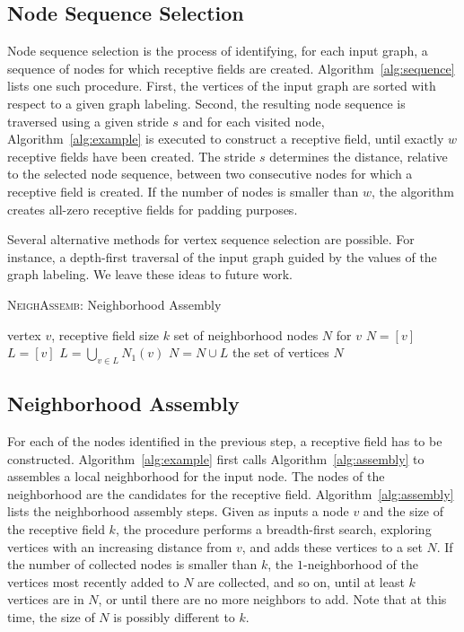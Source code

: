 \documentclass{article}
\begin{document}
\subsection{Node Sequence Selection}
Node sequence selection is the process of identifying, for each input graph, a sequence of nodes for which receptive fields are created. Algorithm~\ref{alg:sequence} lists one such procedure. First, the vertices of the input graph are sorted with respect to a given graph labeling. Second, the resulting node sequence is traversed using a given stride $s$ and for each visited node, Algorithm~\ref{alg:example} is executed to construct a receptive field, until exactly $w$ receptive fields have been created. The stride $s$ determines the distance, relative to the selected node sequence, between two consecutive nodes for which a receptive field is created. If the number of nodes is smaller than $w$, the algorithm creates all-zero receptive fields for padding purposes. 


Several alternative methods for vertex sequence selection are possible. For instance, a depth-first traversal of the input graph guided by the values of the graph labeling. We leave these ideas to future work.

\begin{algorithm}[t!]
  \small
   \caption{\label{alg:assembly}\textsc{NeighAssemb}: Neighborhood Assembly}   
\begin{algorithmic}[1]
    vertex $v$, receptive field size $k$
    set of neighborhood nodes $N$ for $v$
   \STATE $N  = [v]$
   \STATE $L = [v]$
   \STATE $L = \bigcup_{v \in L} N_1(v)$
   \STATE $N = N \cup L$
   \ENDWHILE
    the set of vertices $N$
\end{algorithmic}
\end{algorithm}
\vspace{-1mm}

\subsection{Neighborhood Assembly}

For each of the nodes identified in the previous step, a receptive field has to be constructed. Algorithm~\ref{alg:example} first calls Algorithm~\ref{alg:assembly} to assembles a local neighborhood for the input node. The nodes of the neighborhood are the candidates for the receptive field. Algorithm~\ref{alg:assembly} lists the neighborhood assembly steps. Given as inputs a node $v$ and the size of the receptive field $k$, the procedure performs a breadth-first search, exploring vertices with an increasing distance from $v$, and adds these vertices to a set $N$. If the number of collected nodes is smaller than $k$, the $1$-neighborhood of the  vertices most recently added to $N$ are collected, and so on, until at least $k$ vertices are in $N$, or until there are no more neighbors to add. Note that at this time, the size of $N$ is possibly different to $k$.
\end{document}

